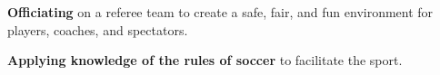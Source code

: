 \begin{bullets}
	\item \textbf{Officiating} on a referee team to create a safe, fair, and fun environment for players, coaches, and spectators.
	\item \textbf{Applying knowledge of the rules of soccer} to facilitate the sport.
\end{bullets}
